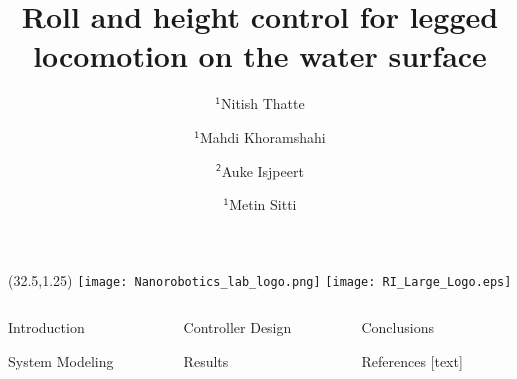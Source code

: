 \documentclass[final]{beamer}
\title{Roll and height control for legged locomotion on the water surface}
\author{$\mathsf{^1}$Nitish Thatte \and $\mathsf{^1}$Mahdi Khoramshahi \and $\mathsf{^2}$Auke Isjpeert \and  $\mathsf{^1}$Metin Sitti}
\institute{
    $\mathsf{^1}$Carnegie Mellon University \hspace{1EM} $\mathsf{^2}$\'{E}cole Polytechnique F\'{e}d\'{e}rale de Lausanne
}
\begin{document}
\begin{textblock}{12}(32.5,1.25)
    \texttt{[image: Nanorobotics\_lab\_logo.png]} 
    \texttt{[image: RI\_Large\_Logo.eps]}
\end{textblock}

\begin{frame}{} 
    \begin{columns}[t]
        \begin{column}{.3\linewidth}
            \begin{block}{Introduction}
                
            \end{block}
            
            \vspace{0.5in}
            \begin{block}{System Modeling}
                
            \end{block}
        \end{column}
        \begin{column}{.3\linewidth}
            \begin{block}{Controller Design}
                
            \end{block}
            \begin{block}{Results}
                \lipsum[5-7]
            \end{block}
        \end{column}
        \begin{column}{.3\linewidth}
            \begin{block}{Conclusions}
                \lipsum[7-8]
            \end{block}

            \vspace{0.5in}
            \begin{block}{References}
                \small
                [text] 
                
                
            \end{block}
        \end{column}
    \end{columns}
\end{frame}
\end{document}

